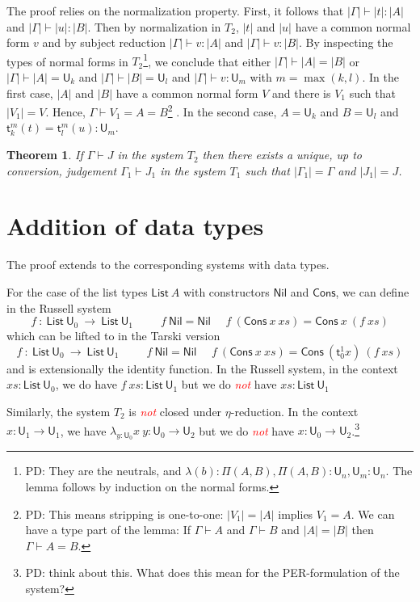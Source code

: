 \documentclass[11pt,a4paper]{article}
\newtheorem{theorem}{Theorem}[section]
\theoremstyle{definition}
\def\UU{\mathsf{U}}
\def\List{\mathsf{List}}
\def\Cons{\mathsf{Cons}}
\def\Nil{\mathsf{Nil}}
\newcommand{\sT}{\mathsf{t}}
\newcommand{\EMP}[1]{\emph{\textcolor{red}{#1}}}
\begin{document}
The proof relies on the normalization property. First, it follows that $|\Gamma | \vdash |t|:|A|$ and $|\Gamma | \vdash |u|:|B|$. Then by normalization in $T_2$, $| t |$ and $| u |$ have a common normal form $v$  and by subject reduction
$|\Gamma | \vdash v : |A|$ and $|\Gamma | \vdash v : |B|$. By inspecting the types of normal forms in $T_2$\footnote{PD: They are the neutrals, and $\lambda(b) : \Pi(A,B), \Pi(A,B) : \UU_n, \UU_m : \UU_n$. The lemma follows by induction on the normal forms.}, we conclude that either $|\Gamma | \vdash |A| = |B|$ or $|\Gamma | \vdash |A| = \UU_k$ and $|\Gamma | \vdash |B| = \UU_l$ and $|\Gamma | \vdash v :\UU_m$ with $m = \max(k,l)$. In the first case,  $|A|$ and $|B|$ have a common normal form $V$ and there is $V_1$ such that $| V_1 |  = V$. Hence, $\Gamma \vdash V_1 = A = B$\footnote{PD: This means stripping is one-to-one: $|V_1| = |A|$ implies $V_1 = A$. We can have a type part of the lemma: If $\Gamma\vdash A$ and $\Gamma\vdash B$ and $|A| = |B|$ then $\Gamma\vdash A = B$. } . In the second case, $A = \UU_k$ and $B = \UU_l$ and $\sT_k^m(t) = \sT_l^m(u):\UU_m$.

\begin{theorem}
  If $\Gamma\vdash J$ in the system $T_2$ then there exists a unique, up to conversion, judgement $\Gamma_1\vdash J_1$
  in the system $T_1$ such that $|\Gamma_1| = \Gamma$ and $|J_1| = J$.
\end{theorem}

\section{Addition of data types}

The proof extends to the corresponding systems with data types.

For the case of the list types $\List~A$ with constructors $\Nil$ and $\Cons$, we can define in the Russell system
$$
f~:~\List~\UU_0~\rightarrow~\List~\UU_1~~~~~~~~~~~
f~\Nil = \Nil~~~~~~f~(\Cons~x~xs) = \Cons~x~(f~xs)
$$
which can be lifted to in the Tarski version
$$
f~:~\List~\UU_0~\rightarrow~\List~\UU_1~~~~~~~~~~~
f~\Nil = \Nil~~~~~~f~(\Cons~x~xs) = \Cons~(\sT_0^1 x)~(f~xs)
$$
and is extensionally the identity function.
In the Russell system, in the context  $xs:\List~\UU_0$,
we do have $f~xs:\List~\UU_1$ but we do \EMP{not} have $xs:\List~\UU_1$

\medskip

     Similarly, the system $T_2$ is \EMP{not} closed under $\eta$-reduction. In the context
     $x:\UU_1\rightarrow\UU_1$, 
     we have $\lambda_{y:\UU_0}x~y:\UU_0\rightarrow\UU_2$ but we do \EMP{not} have
     $x:\UU_0\rightarrow\UU_2$.\footnote{PD: think about this. What does this mean for the PER-formulation of the system?}
\end{document}
